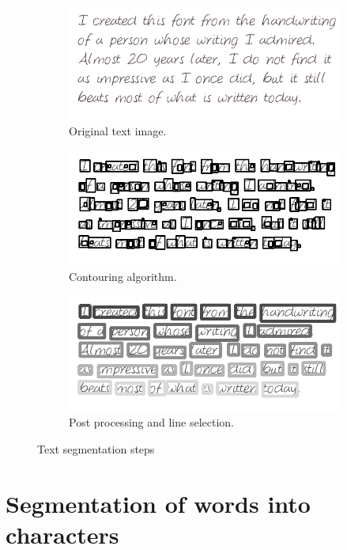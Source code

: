 \documentclass{article}
\begin{document}
\begin{figure}
    \begin{subfigure}{\linewidth}
    \centering
    \includegraphics[width=.7\linewidth]{images/text}
    \vspace{-5px}
    \caption*{Original text image.}
    \end{subfigure}
    \begin{subfigure}{\linewidth}
    \centering
    \includegraphics[width=.7\linewidth]{images/cont}
    \vspace{-5px}
    \caption*{Contouring algorithm.}
    \end{subfigure}
    \begin{subfigure}{\linewidth}
    \centering
    \includegraphics[width=.7\linewidth]{images/lines}
    \vspace{-5px}
    \caption*{Post processing and line selection.}
    \end{subfigure}
    \vspace{-10px}
    \caption{Text segmentation steps}
    \label{fig:text_segm}
    \vspace{-20px}
\end{figure}


\section{Segmentation of words into characters}
\label{sec:segword}
\end{document}
